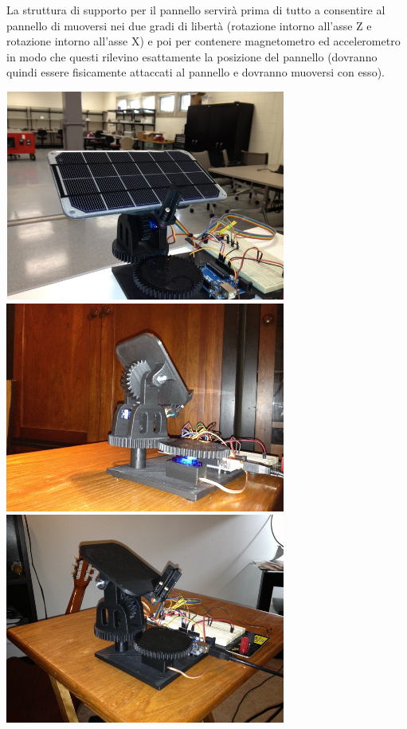 \noindent La struttura di supporto per il pannello servirà prima di tutto a
consentire al pannello di muoversi nei due gradi di libertà (rotazione
intorno all'asse Z e rotazione intorno all'asse X) e poi per contenere
magnetometro ed accelerometro in modo che questi rilevino esattamente la
posizione del pannello (dovranno quindi essere fisicamente attaccati al
pannello e dovranno muoversi con esso).

\begin{center}
\includegraphics[width=3.63in,height=2.72in]{figures/image52.png}
\includegraphics[width=3.63in,height=2.72in]{figures/image68.png}
\includegraphics[width=3.63in,height=2.72in]{figures/image20.png}
\captionsetup{type=figure}
\end{center}

